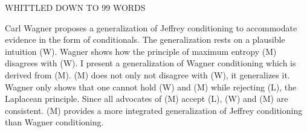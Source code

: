 WHITTLED DOWN TO 99 WORDS

Carl Wagner proposes a generalization of Jeffrey conditioning to accommodate evidence in the form of conditionals. The generalization rests on a plausible intuition (W). Wagner shows how the principle of maximum entropy (M) disagrees with (W). I present a generalization of Wagner conditioning which is derived from (M). (M) does not only not disagree with (W), it generalizes it. Wagner only shows that one cannot hold (W) and (M) while rejecting (L), the Laplacean principle. Since all advocates of (M) accept (L), (W) and (M) are consistent. (M) provides a more integrated generalization of Jeffrey conditioning than Wagner conditioning.
